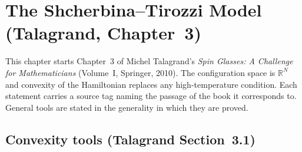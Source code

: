 \chapter{The Shcherbina--Tirozzi Model (Talagrand, Chapter~3)}\label{chap:sg-talagrand-shcherbina-tirozzi}

This chapter starts Chapter~3 of Michel Talagrand's \emph{Spin Glasses: A Challenge for Mathematicians}
(Volume~I, Springer, 2010). The configuration space is $\mathbb R^N$ and convexity of the Hamiltonian
replaces any high-temperature condition. Each statement carries a source tag naming the passage of the book
it corresponds to. General tools are stated in the generality in which they are proved.

\section{Convexity tools (Talagrand Section~3.1)}\label{sec:sg-tal:st-convexity-tools}

